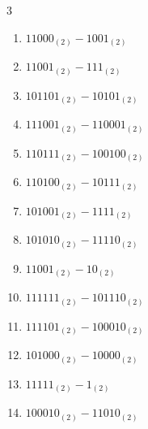 \begin{multicols}{3}
\begin{enumerate}
  \item $11000_{(2)} - 1001_{(2)}$


  \item $11001_{(2)} - 111_{(2)}$


  \item $101101_{(2)} - 10101_{(2)}$


  \item $111001_{(2)} - 110001_{(2)}$


  \item $110111_{(2)} - 100100_{(2)}$


  \item $110100_{(2)} - 10111_{(2)}$


  \item $101001_{(2)} - 1111_{(2)}$


\columnbreak %

  \item $101010_{(2)} - 11110_{(2)}$


  \item $11001_{(2)} - 10_{(2)}$


  \item $111111_{(2)} - 101110_{(2)}$


  \item $111101_{(2)} - 100010_{(2)}$


  \item $101000_{(2)} - 10000_{(2)}$


  \item $11111_{(2)} - 1_{(2)}$


  \item $100010_{(2)} - 11010_{(2)}$


\end{enumerate}
\end{multicols}
